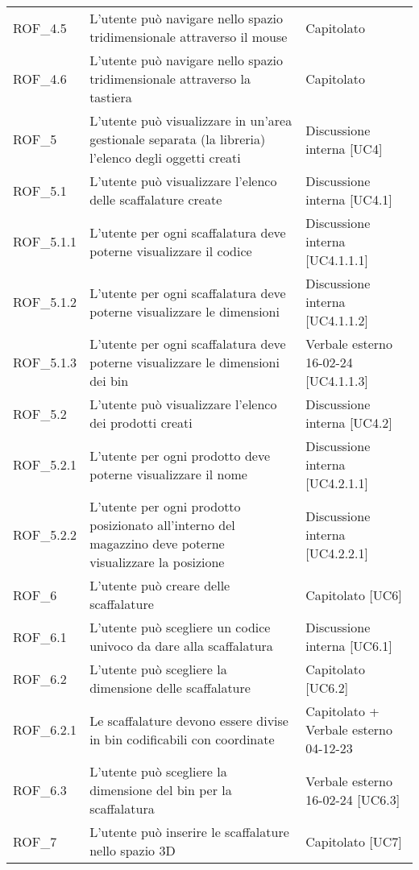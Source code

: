 \begin{xltabular}{\textwidth}{ p{0.2\textwidth} | X | p{0.2\textwidth} }
    ROF\_4.5& L'utente può navigare nello spazio tridimensionale attraverso il mouse& Capitolato\\
    ROF\_4.6& L'utente può navigare nello spazio tridimensionale attraverso la tastiera& Capitolato\\
    ROF\_5& L'utente può visualizzare in un'area gestionale separata (la libreria) l'elenco degli oggetti creati & Discussione interna [UC4] \\
    ROF\_5.1& L'utente può visualizzare l'elenco delle scaffalature create & Discussione interna [UC4.1] \\
    ROF\_5.1.1& L'utente per ogni scaffalatura deve poterne visualizzare il codice & Discussione interna [UC4.1.1.1]\\
    ROF\_5.1.2& L'utente per ogni scaffalatura deve poterne visualizzare le dimensioni & Discussione interna [UC4.1.1.2]\\
    ROF\_5.1.3 & L'utente per ogni scaffalatura deve poterne visualizzare le dimensioni dei bin & Verbale esterno 16-02-24 [UC4.1.1.3]\\
    ROF\_5.2& L'utente può visualizzare l'elenco dei prodotti creati & Discussione interna [UC4.2] \\
    ROF\_5.2.1& L'utente per ogni prodotto deve poterne visualizzare il nome & Discussione interna [UC4.2.1.1]\\
    ROF\_5.2.2& L'utente per ogni prodotto posizionato all'interno del magazzino deve poterne visualizzare la posizione & Discussione interna [UC4.2.2.1] \\
    ROF\_6& L'utente può creare delle scaffalature & Capitolato [UC6]\\
    ROF\_6.1& L'utente può scegliere un codice univoco da dare alla scaffalatura & Discussione interna [UC6.1]\\
    ROF\_6.2& L'utente può scegliere la dimensione delle scaffalature & Capitolato [UC6.2]\\
    ROF\_6.2.1& Le scaffalature devono essere divise in bin codificabili con coordinate & Capitolato + Verbale esterno 04-12-23\\
    ROF\_6.3& L'utente può scegliere la dimensione del bin per la scaffalatura & Verbale esterno 16-02-24 [UC6.3]\\
    ROF\_7& L'utente può inserire le scaffalature nello spazio 3D & Capitolato [UC7]\\

\end{xltabular}
